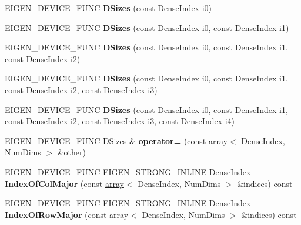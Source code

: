 \begin{DoxyCompactItemize}
\item 
\mbox{\label{struct_eigen_1_1_d_sizes_a3a9bcb4c74aaae3af0dd27701c1ba6ad}} 
E\+I\+G\+E\+N\+\_\+\+D\+E\+V\+I\+C\+E\+\_\+\+F\+U\+NC {\bfseries D\+Sizes} (const Dense\+Index i0)
\item 
\mbox{\label{struct_eigen_1_1_d_sizes_a301261808ad4fef4f1f3f93be884ca52}} 
E\+I\+G\+E\+N\+\_\+\+D\+E\+V\+I\+C\+E\+\_\+\+F\+U\+NC {\bfseries D\+Sizes} (const Dense\+Index i0, const Dense\+Index i1)
\item 
\mbox{\label{struct_eigen_1_1_d_sizes_accbad3b5f8b23e7b1db8471ba448d6bb}} 
E\+I\+G\+E\+N\+\_\+\+D\+E\+V\+I\+C\+E\+\_\+\+F\+U\+NC {\bfseries D\+Sizes} (const Dense\+Index i0, const Dense\+Index i1, const Dense\+Index i2)
\item 
\mbox{\label{struct_eigen_1_1_d_sizes_a1df542d8f562f46561afe36d18514e10}} 
E\+I\+G\+E\+N\+\_\+\+D\+E\+V\+I\+C\+E\+\_\+\+F\+U\+NC {\bfseries D\+Sizes} (const Dense\+Index i0, const Dense\+Index i1, const Dense\+Index i2, const Dense\+Index i3)
\item 
\mbox{\label{struct_eigen_1_1_d_sizes_a57846297a65548998c5c78733c3ee550}} 
E\+I\+G\+E\+N\+\_\+\+D\+E\+V\+I\+C\+E\+\_\+\+F\+U\+NC {\bfseries D\+Sizes} (const Dense\+Index i0, const Dense\+Index i1, const Dense\+Index i2, const Dense\+Index i3, const Dense\+Index i4)
\item 
\mbox{\label{struct_eigen_1_1_d_sizes_a4f3590b533ebae90ce68f0140de4d022}} 
E\+I\+G\+E\+N\+\_\+\+D\+E\+V\+I\+C\+E\+\_\+\+F\+U\+NC \hyperlink{struct_eigen_1_1_d_sizes}{D\+Sizes} \& {\bfseries operator=} (const \hyperlink{class_eigen_1_1array}{array}$<$ Dense\+Index, Num\+Dims $>$ \&other)
\item 
\mbox{\label{struct_eigen_1_1_d_sizes_ab782efe1803d83cca93eb7efb942f5b9}} 
E\+I\+G\+E\+N\+\_\+\+D\+E\+V\+I\+C\+E\+\_\+\+F\+U\+NC E\+I\+G\+E\+N\+\_\+\+S\+T\+R\+O\+N\+G\+\_\+\+I\+N\+L\+I\+NE Dense\+Index {\bfseries Index\+Of\+Col\+Major} (const \hyperlink{class_eigen_1_1array}{array}$<$ Dense\+Index, Num\+Dims $>$ \&indices) const
\item 
\mbox{\label{struct_eigen_1_1_d_sizes_af393d79554f9015bf9b20862b876db3d}} 
E\+I\+G\+E\+N\+\_\+\+D\+E\+V\+I\+C\+E\+\_\+\+F\+U\+NC E\+I\+G\+E\+N\+\_\+\+S\+T\+R\+O\+N\+G\+\_\+\+I\+N\+L\+I\+NE Dense\+Index {\bfseries Index\+Of\+Row\+Major} (const \hyperlink{class_eigen_1_1array}{array}$<$ Dense\+Index, Num\+Dims $>$ \&indices) const
\end{DoxyCompactItemize}
